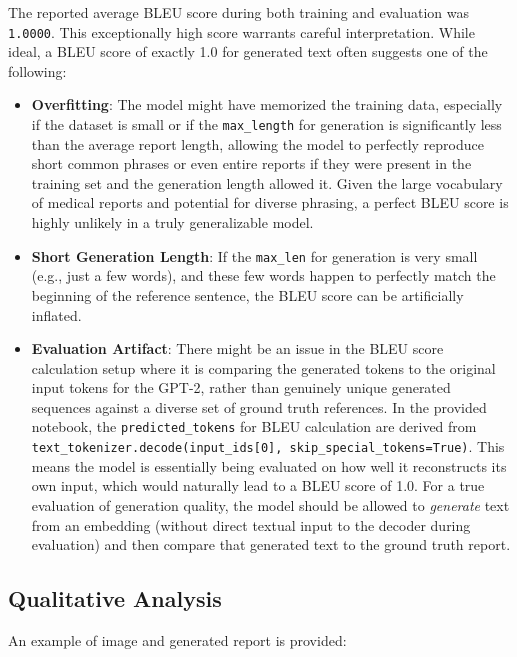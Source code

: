 \documentclass[a4paper, 12pt]{article}
\begin{document}
\begin{itemize}
The reported average BLEU score during both training and evaluation was \texttt{1.0000}. This exceptionally high score warrants careful interpretation. While ideal, a BLEU score of exactly 1.0 for generated text often suggests one of the following:
\begin{itemize}
    \item \textbf{Overfitting}: The model might have memorized the training data, especially if the dataset is small or if the \texttt{max\_length} for generation is significantly less than the average report length, allowing the model to perfectly reproduce short common phrases or even entire reports if they were present in the training set and the generation length allowed it. Given the large vocabulary of medical reports and potential for diverse phrasing, a perfect BLEU score is highly unlikely in a truly generalizable model.
    \item \textbf{Short Generation Length}: If the \texttt{max\_len} for generation is very small (e.g., just a few words), and these few words happen to perfectly match the beginning of the reference sentence, the BLEU score can be artificially inflated.
    \item \textbf{Evaluation Artifact}: There might be an issue in the BLEU score calculation setup where it is comparing the generated tokens to the original input tokens for the GPT-2, rather than genuinely unique generated sequences against a diverse set of ground truth references. In the provided notebook, the \texttt{predicted\_tokens} for BLEU calculation are derived from \texttt{text\_tokenizer.decode(input\_ids[0], skip\_special\_tokens=True)}. This means the model is essentially being evaluated on how well it reconstructs its own input, which would naturally lead to a BLEU score of 1.0. For a true evaluation of generation quality, the model should be allowed to \textit{generate} text from an embedding (without direct textual input to the decoder during evaluation) and then compare that generated text to the ground truth report.
\end{itemize}

\subsection{Qualitative Analysis}
An example of image and generated report is provided:


\end{itemize}
\end{document}
